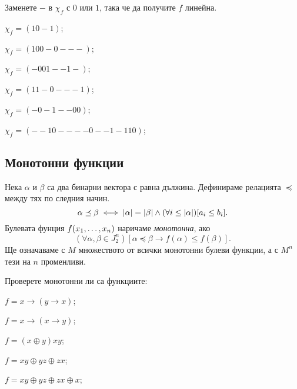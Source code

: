 \begin{problem}
  Заменете $-$ в $\chi_f$ с $0$ или $1$, така че да получите $f$ линейна.\\  
  \begin{inparaenum}[a)]
  \item
    $\chi_f = (10-1)$;
  \item
    $\chi_f = (100-0---)$;
  \item
    $\chi_f = (-001--1-)$;
  \item
    $\chi_f = (11-0---1)$;
  \item
    $\chi_f = (-0-1--00)$;
  \item
    $\chi_f = (--10----0--1-110)$;
  \end{inparaenum}
\end{problem}


\subsection{Монотонни функции}

Нека $\alpha$ и $\beta$ са два бинарни вектора с равна дължина.
Дефинираме релацията $\preceq$ между тях по следния начин.
\[\alpha \preceq \beta \iff \vert{\alpha}\vert = \vert{\beta}\vert\wedge (\forall i \leq \vert{\alpha}\vert)[a_i \leq b_i].\]
Булевата фунция $f(x_{1},\dots,x_{n})$ наричаме {\em монотонна}, ако 
\[(\forall \alpha,\beta\in J^n_2 )[\alpha\preceq\beta \rightarrow f(\alpha) \leq f(\beta)].\]
Ще означаваме с $M$ множеството от всички монотонни булеви функции, а с $M^n$ тези на $n$ променливи.

\begin{problem}
  Проверете монотонни ли са функциите:\\
  \begin{inparaenum}[a)]
  \item
    $f = x\rightarrow (y\rightarrow x)$;
  \item
    $f = x\rightarrow (x\rightarrow y)$;
  \item
    $f = (x\oplus y)xy$;
  \item
    $f = xy\oplus yz \oplus zx$;
  \item
    $f = xy\oplus yz \oplus zx \oplus x$;
  \end{inparaenum}
\end{problem}

